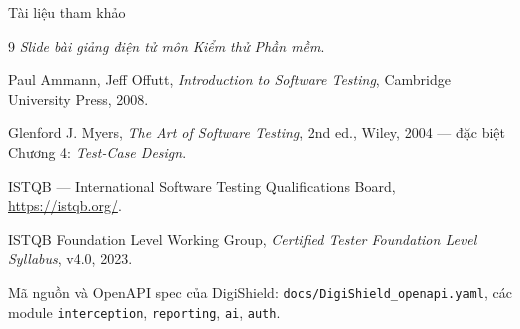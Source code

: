 \documentclass[aspectratio=169,12pt]{beamer}
\begin{document}
\begin{frame}{Tài liệu tham khảo}
  \vspace*{-0.4em}
  \footnotesize
  \begin{thebibliography}{9}
    \textit{Slide bài giảng điện tử môn Kiểm thử Phần mềm}.

    Paul Ammann, Jeff Offutt,
    \textit{Introduction to Software Testing}, Cambridge University Press, 2008.

    Glenford J. Myers,
    \textit{The Art of Software Testing}, 2nd ed., Wiley, 2004
    --- đặc biệt Chương 4: \textit{Test-Case Design}.

    ISTQB --- International Software Testing Qualifications Board,
    \url{https://istqb.org/}.

    ISTQB Foundation Level Working Group,
    \textit{Certified Tester Foundation Level Syllabus}, v4.0, 2023.

    Mã nguồn và OpenAPI spec của DigiShield:
    \texttt{docs/DigiShield\_openapi.yaml}, các module
    \texttt{interception}, \texttt{reporting}, \texttt{ai}, \texttt{auth}.
  \end{thebibliography}
\end{frame}

\end{document}
